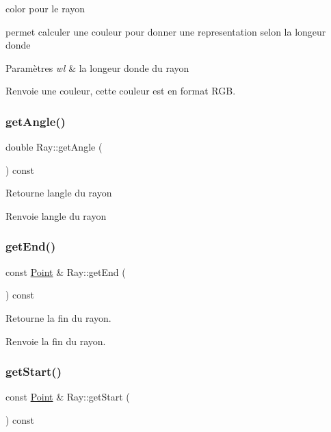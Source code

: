 color pour le rayon 

permet calculer une couleur pour donner une representation selon la longeur d\textquotesingle{}onde 
\begin{DoxyParams}{Paramètres}
{\em wl} & la longeur d\textquotesingle{}onde du rayon \\
\hline
\end{DoxyParams}
\begin{DoxyReturn}{Renvoie}
une couleur, cette couleur est en format R\+GB. 
\end{DoxyReturn}
\mbox{\label{class_ray_aa5c3f9746583b826471f3414af98eb09}} 
\subsubsection{\texorpdfstring{getAngle()}{getAngle()}}
{\footnotesize\ttfamily double Ray\+::get\+Angle (\begin{DoxyParamCaption}{ }\end{DoxyParamCaption}) const}

Retourne l\textquotesingle{}angle du rayon \begin{DoxyReturn}{Renvoie}
l\textquotesingle{}angle du rayon 
\end{DoxyReturn}
\mbox{\label{class_ray_a5ad0bb5d3a14e9425dfd6b4d653604bd}} 
\subsubsection{\texorpdfstring{getEnd()}{getEnd()}}
{\footnotesize\ttfamily const \mbox{\hyperlink{class_point}{Point}} \& Ray\+::get\+End (\begin{DoxyParamCaption}{ }\end{DoxyParamCaption}) const}

Retourne la fin du rayon. \begin{DoxyReturn}{Renvoie}
la fin du rayon. 
\end{DoxyReturn}
\mbox{\label{class_ray_aa897fef03c37b10770dbb5c720af85bb}} 
\subsubsection{\texorpdfstring{getStart()}{getStart()}}
{\footnotesize\ttfamily const \mbox{\hyperlink{class_point}{Point}} \& Ray\+::get\+Start (\begin{DoxyParamCaption}{ }\end{DoxyParamCaption}) const}

